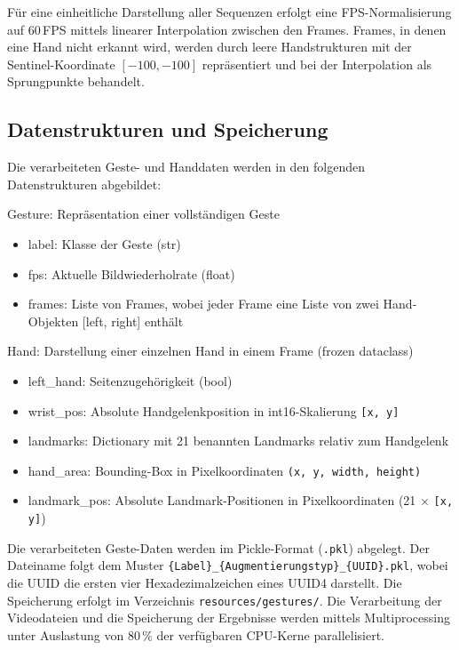 Für eine einheitliche Darstellung aller Sequenzen erfolgt eine FPS-Normalisierung auf 60\,FPS mittels linearer Interpolation zwischen den Frames. Frames, in denen eine Hand nicht erkannt wird, werden durch leere Handstrukturen mit der Sentinel-Koordinate \([{-100}, {-100}]\) repräsentiert und bei der Interpolation als Sprungpunkte behandelt.

\subsection{Datenstrukturen und Speicherung}\label{sub:datenstrukturen}

Die verarbeiteten Geste- und Handdaten werden in den folgenden Datenstrukturen abgebildet:

Gesture: Repräsentation einer vollständigen Geste
\begin{itemize}
    \item label: Klasse der Geste (str)
    \item fps: Aktuelle Bildwiederholrate (float)
    \item frames: Liste von Frames, wobei jeder Frame eine Liste von zwei Hand-Objekten [left, right] enthält
\end{itemize}

Hand: Darstellung einer einzelnen Hand in einem Frame (frozen dataclass)
\begin{itemize}
    \item left\_hand: Seitenzugehörigkeit (bool)
    \item wrist\_pos: Absolute Handgelenkposition in int16-Skalierung \texttt{[x, y]}
    \item landmarks: Dictionary mit 21 benannten Landmarks relativ zum Handgelenk
    \item hand\_area: Bounding-Box in Pixelkoordinaten \texttt{(x, y, width, height)}
    \item landmark\_pos: Absolute Landmark-Positionen in Pixelkoordinaten (21 $\times$ \texttt{[x, y]})
\end{itemize}

Die verarbeiteten Geste-Daten werden im Pickle-Format (\texttt{.pkl}) abgelegt. Der Dateiname folgt dem Muster \texttt{\{Label\}\_\{Augmentierungstyp\}\_\{UUID\}.pkl}, wobei die UUID die ersten vier Hexadezimalzeichen eines UUID4 darstellt. Die Speicherung erfolgt im Verzeichnis \texttt{resources/gestures/}. Die Verarbeitung der Videodateien und die Speicherung der Ergebnisse werden mittels Multiprocessing unter Auslastung von 80\,\% der verfügbaren CPU-Kerne parallelisiert.

